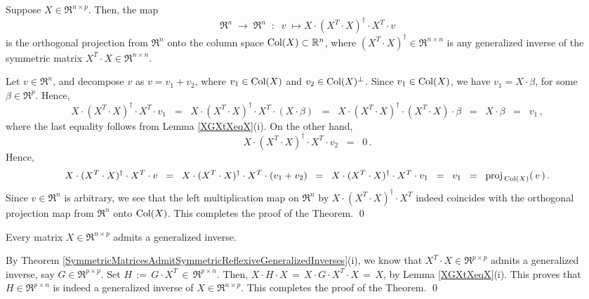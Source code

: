 \begin{theorem}
\mbox{}\vskip 0.1cm\noindent
Suppose $X \in \Re^{n \times p}$.
Then, the map
\begin{equation*}
\Re^{n} \; \longrightarrow \; \Re^{n}
\;\; : \;\;
v \; \longmapsto X \cdot (X^{T} \cdot X)^{\dagger} \cdot X^{T} \cdot v
\end{equation*}
is the orthogonal projection from $\Re^{n}$ onto the column space
$\textnormal{Col}(X) \subset \mathbb{R}^{n}$, where
$(X^{T} \cdot X)^{\dagger} \in \Re^{n \times n}$ is any generalized inverse of the symmetric
matrix $X^{T} \cdot X \in \Re^{n \times n}$.
\end{theorem}
\proof
Let $v \in \Re^{n}$, and decompose $v$ as $v = v_{1} + v_{2}$,
where $v_{1} \in \textnormal{Col}(X)$ and $v_{2} \in \textnormal{Col}(X)^{\perp}$.
Since $v_{1} \in \textnormal{Col}(X)$, we have $v_{1} = X\cdot\beta$,
for some $\beta \in \Re^{p}$.
Hence,
\begin{equation*}
X \cdot (X^{T} \cdot X)^{\dagger} \cdot X^{T} \cdot v_{1}
\;\; = \;\;
	X \cdot (X^{T} \cdot X)^{\dagger} \cdot X^{T} \cdot (X \cdot \beta)
\;\; = \;\;
	X \cdot (X^{T} \cdot X)^{\dagger} \cdot (X^{T} \cdot X) \cdot \beta
\;\; = \;\;
	X \cdot \beta
\;\; = \;\;
	v_{1}\,,
\end{equation*}
where the last equality follows from Lemma \ref{XGXtXeqX}(i).
On the other hand,
\begin{equation*}
X \cdot (X^{T} \cdot X)^{\dagger} \cdot X^{T} \cdot v_{2}
\;\; = \;\;
	0\,.
\end{equation*}
Hence,
\begin{equation*}
X \cdot (X^{T} \cdot X)^{\dagger} \cdot X^{T} \cdot v
\;\; = \;\;
	X \cdot (X^{T} \cdot X)^{\dagger} \cdot X^{T} \cdot (v_{1} + v_{2})
\;\; = \;\;
	X \cdot (X^{T} \cdot X)^{\dagger} \cdot X^{T} \cdot v_{1}
\;\; = \;\;
	v_{1}
\;\; = \;\;
	\textnormal{proj}_{\,\textnormal{Col}(X)}(\,v\,)\,.
\end{equation*}
Since $v \in \Re^{n}$ is arbitrary, we see that the left multiplication map on $\Re^{n}$
by $X \cdot (X^{T} \cdot X)^{\dagger} \cdot X^{T}$ indeed coincides with the
orthogonal projection map from $\Re^{n}$ onto $\textnormal{Col}(X)$.
This completes the proof of the Theorem.
\qed

\begin{theorem}
\mbox{}\vskip 0.1cm\noindent
Every matrix $X \in \Re^{n \times p}$ admits a generalized inverse.
\end{theorem}
\proof
By Theorem \ref{SymmetricMatricesAdmitSymmetricReflexiveGeneralizedInverses}(i),
we know that $X^{T} \cdot X \in \Re^{p \times p}$ admits a generalized inverse, say $G \in \Re^{p \times p}$.
Set $H \,:=\, G \cdot X^{T} \,\in\, \Re^{p \times n}$.
Then, $X \cdot H \cdot X \,=\, X \cdot G \cdot X^{T} \cdot X \,=\, X$, by Lemma \ref{XGXtXeqX}(i).
This proves that $H \in \Re^{p \times n}$ is indeed a generalized inverse of $X \in \Re^{n \times p}$.
This completes the proof of the Theorem.
\qed


